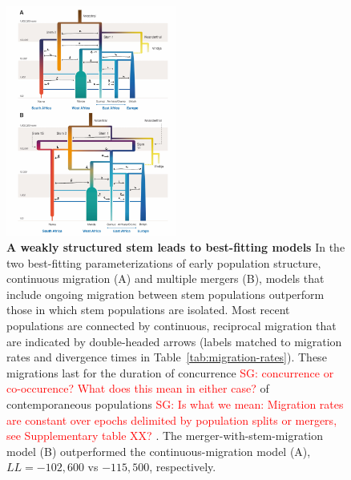 \documentclass[]{article}
\newcommand{\sgcomment}[1]{{\textcolor{red}{SG: #1}}}
\begin{document}
\begin{figure}[t!]
    \centering
    \includegraphics[width=0.5\textwidth]{figures/fig2}
    \caption{
        \textbf{A weakly structured stem leads to best-fitting models}
        In the two best-fitting parameterizations of early population structure,
        continuous migration (A) and multiple mergers (B), models
        that include ongoing migration between stem populations outperform
        those in which stem populations are isolated. Most recent populations are
        connected by continuous, reciprocal migration that are indicated by 
        double-headed arrows (labels matched to migration rates and divergence
        times in Table~\ref{tab:migration-rates}). These migrations last for the
        duration of concurrence \sgcomment{concurrence or co-occurence? What does this mean in either case?} of contemporaneous populations \sgcomment{Is what we mean: Migration rates are constant over epochs delimited by population splits or mergers, see Supplementary table XX? }. The
        merger-with-stem-migration model (B) outperformed the
        continuous-migration model (A), $LL=-102,600$ vs $-115,500$,
        respectively.
    }
    \label{fig:2}
\end{figure}
\end{document}
